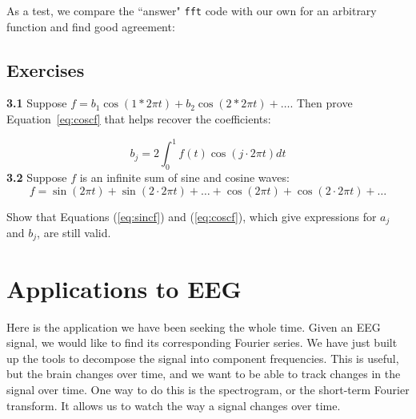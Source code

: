 \documentclass{article}
\begin{document}
As a test, we compare the ``answer" {\tt fft} code with our own for an arbitrary function and find good agreement:






\subsection*{Exercises}
{\bf 3.1} Suppose $f = b_1\cos(1 * 2\pi t)+b_2\cos(2 * 2\pi t)+\dots$.  Then prove Equation~\ref{eq:coscf} that helps recover the coefficients:

$$b_j = 2 \int_{0}^1f(t)\cos(j \cdot 2\pi t)dt$$
{\bf 3.2} Suppose $f$ is an infinite sum of sine and cosine waves:
\[f = \sin(2\pi t)+ \sin(2\cdot2\pi t) +\dots + \cos(2\pi t)+ \cos(2\cdot2\pi t) +\dots\]

Show that Equations (\ref{eq:sincf}) and (\ref{eq:coscf}), which give expressions for $a_j$ and $b_j$, are still valid.


\section{Applications to EEG}
Here is the application we have been seeking the whole time.  Given an EEG signal, we would like to find its corresponding Fourier series.  We have just built up the tools to decompose the signal into component frequencies.  This is useful, but the brain changes over time, and we want to be able to track changes in the signal over time.  One way to do this is the spectrogram, or the short-term Fourier transform.  It allows us to watch the way a signal changes over time.  
\end{document}
